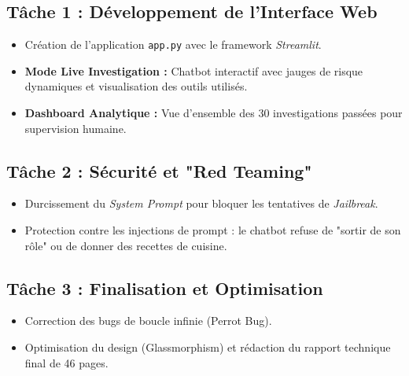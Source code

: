 \documentclass[a4paper,11pt]{article}
\begin{document}
\subsection{Tâche 1 : Développement de l'Interface Web}
\begin{itemize}
    \item Création de l'application \texttt{app.py} avec le framework \textit{Streamlit}.
    \item \textbf{Mode Live Investigation :} Chatbot interactif avec jauges de risque dynamiques et visualisation des outils utilisés.
    \item \textbf{Dashboard Analytique :} Vue d'ensemble des 30 investigations passées pour supervision humaine.
\end{itemize}

\subsection{Tâche 2 : Sécurité et "Red Teaming"}
\begin{itemize}
    \item Durcissement du \textit{System Prompt} pour bloquer les tentatives de \textit{Jailbreak}.
    \item Protection contre les injections de prompt : le chatbot refuse de "sortir de son rôle" ou de donner des recettes de cuisine.
\end{itemize}

\subsection{Tâche 3 : Finalisation et Optimisation}
\begin{itemize}
    \item Correction des bugs de boucle infinie (Perrot Bug).
    \item Optimisation du design (Glassmorphism) et rédaction du rapport technique final de 46 pages.
\end{itemize}
\end{document}
